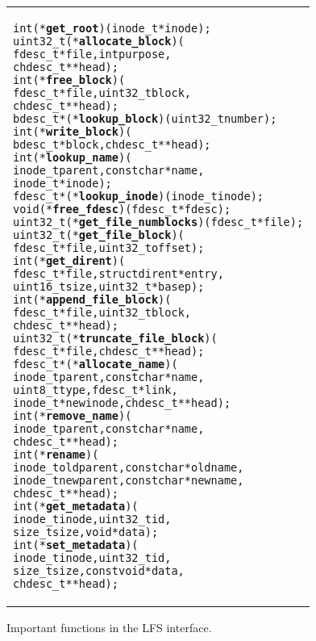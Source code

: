\begin{figure}[thb]
\vskip-14pt
\begin{tabular}{@{\hskip0.25in}p{2in}@{}}
\begin{scriptsize}
\begin{alltt}
int (*\textbf{get_root})(inode_t *inode);
uint32_t (*\textbf{allocate_block})(
    fdesc_t *file, int purpose,
    chdesc_t **head);
int (*\textbf{free_block})(
    fdesc_t *file, uint32_t block,
    chdesc_t **head);
bdesc_t *(*\textbf{lookup_block})(uint32_t number);
int (*\textbf{write_block})(
    bdesc_t *block, chdesc_t **head);
int (*\textbf{lookup_name})(
    inode_t parent, const char *name,
    inode_t *inode);
fdesc_t *(*\textbf{lookup_inode})(inode_t inode);
void (*\textbf{free_fdesc})(fdesc_t *fdesc);
uint32_t (*\textbf{get_file_numblocks})(fdesc_t *file);
uint32_t (*\textbf{get_file_block})(
    fdesc_t *file, uint32_t offset);
int (*\textbf{get_dirent})(
    fdesc_t *file, struct dirent *entry,
    uint16_t size, uint32_t *basep);
int (*\textbf{append_file_block})(
    fdesc_t *file, uint32_t block,
    chdesc_t **head);
uint32_t (*\textbf{truncate_file_block})(
    fdesc_t *file, chdesc_t **head);
fdesc_t *(*\textbf{allocate_name})(
    inode_t parent, const char *name,
    uint8_t type, fdesc_t *link,
    inode_t *newinode, chdesc_t **head);
int (*\textbf{remove_name})(
    inode_t parent, const char *name,
    chdesc_t **head);
int (*\textbf{rename})(
    inode_t oldparent, const char *oldname,
    inode_t newparent, const char *newname,
    chdesc_t **head);
int (*\textbf{get_metadata})(
    inode_t inode, uint32_t id,
    size_t size, void *data);
int (*\textbf{set_metadata})(
    inode_t inode, uint32_t id,
    size_t size, const void *data,
    chdesc_t **head);
\end{alltt}
\end{scriptsize}
\end{tabular}
\vspace{-10pt}
\caption{\label{fig:lfs} Important functions in the LFS interface.}
\end{figure}
